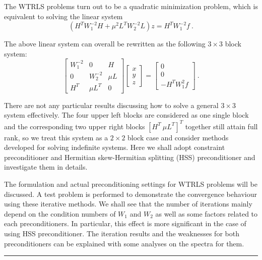 \documentclass[twosided]{report}
\begin{document}
The WTRLS problems turn out to be a quadratic minimization
problem, which is equivalent to solving the linear system
$$ 
(H^{T}W_{1}^{-2}H + \mu^{2} L^{T}W_{2}^{-2}L)z
= H^{T} W_{1}^{-2} f~.
$$

The above linear system can overall be rewritten as
the following $3 \times 3$ block system:
$$ 
\left[ \begin{array}{ccc} W_{1}^{-2} & 0 & H \\
0 & W_{2}^{-2} & \mu L \\
H^{T} & \mu L^{T} & 0 \end{array} \right]
\left[ \begin{array}{c} x \\ y \\ z \end{array} \right]
= \left[ \begin{array}{c} 0 \\ 0 \\
-H^{T} W_{1}^{2} f \end{array} \right]~.
$$

There are not any particular results discussing how
to solve a general $3 \times 3$ system effectively.  
The four upper left blocks are considered as one single
block and the corresponding two upper right blocks
$[H^{T} \ \mu L^{T}]^{T}$ together
still attain full rank, so we treat this system
as a $2 \times 2$ block case 
and consider methods developed for solving indefinite systems.  
Here we shall adopt constraint preconditioner 
and Hermitian skew-Hermitian splitting (HSS)
preconditioner and investigate them in details.

The formulation and actual preconditioning settings for
WTRLS problems will be discussed.
A test problem is performed to demonstrate the convergence behaviour
using these iterative methods.  We shall see that the number of iterations
mainly depend on the condition numbers of $W_{1}$ and $W_{2}$ as
well as some factors related to each preconditioners. 
In particular, this effect is more significant in
the case of using HSS preconditioner.  The iteration results and
the weaknesses for both preconditioners can be explained
with some analyses on the spectra for them.



	\begin{center} \rule{6in}{1pt} \end{center}
\end{document}
